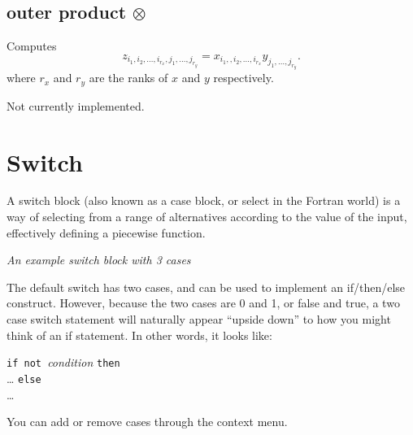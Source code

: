 \subsection{outer product $\otimes$}\label{Operation:outerProduct}
Computes 
\begin{displaymath}
z_{i_1,i_2,\ldots,i_{r_x},j_1,\ldots,j_{r_y}} =
x_{i_1,,i_2,\ldots,i_{r_x}}y_{j_1,\ldots,j_{r_y}}.
\end{displaymath}
where $r_x$ and $r_y$ are the ranks of $x$ and $y$ respectively.

Not currently implemented.

\section{Switch}\label{SwitchIcon}

A switch block (also known as a case block, or select in the Fortran
world) is a way of selecting from a range of alternatives according
to the value of the input, effectively defining a piecewise function.

\begin{center}
{\em An example switch block with 3 cases}
\end{center}

The default switch has two cases, and can be used to implement an
if/then/else construct. However, because the two cases are 0 and 1,
or false and true, a two case switch statement will naturally appear
``upside down'' to how you might think of an if statement. In other
words, it looks like:

\parbox{\textwidth}{
{\tt if not }{\em condition} {\tt then}\\
 \ldots
{\tt else}\\
\ldots
}

You can add or remove cases through the context menu. 

